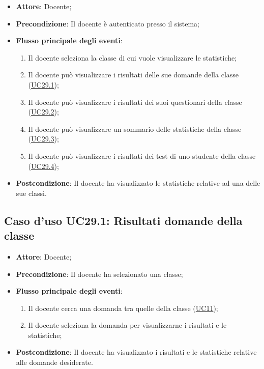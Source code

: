 \documentclass[12pt,a4paper]{article}
\begin{document}
\begin{itemize}

\item \textbf{Attore}: Docente; 
\item \textbf{Precondizione}: Il docente è autenticato presso il sistema;

\item \textbf{Flusso principale degli eventi}:
\begin{enumerate}
	\item Il docente seleziona la classe di cui vuole visualizzare le statistiche;
	\item Il docente può visualizzare i risultati delle sue domande della classe (\hyperlink{UC29.1}{UC29.1});
	\item Il docente può visualizzare i risultati dei suoi questionari della classe (\hyperlink{UC29.2}{UC29.2});
	\item Il docente può visualizzare un sommario delle statistiche della classe (\hyperlink{UC29.3}{UC29.3});
	\item Il docente può visualizzare i risultati dei test di uno studente della classe (\hyperlink{UC29.4}{UC29.4});
	
\end{enumerate}
\item \textbf{Postcondizione}: Il docente ha visualizzato le statistiche relative ad una delle sue classi.
\end{itemize}
\hypertarget{UC29.1}{}
\subsection{Caso d'uso UC29.1: Risultati domande della classe}

\begin{itemize}

\item \textbf{Attore}: Docente; 
\item \textbf{Precondizione}: Il docente ha selezionato una classe;

\item \textbf{Flusso principale degli eventi}:
\begin{enumerate}
	\item Il docente cerca una domanda tra quelle della classe (\hyperlink{UC11}{UC11});
	\item Il docente seleziona la domanda per visualizzarne i risultati e le statistiche;
	
\end{enumerate}
\item \textbf{Postcondizione}: Il docente ha visualizzato i risultati e le statistiche relative alle domande desiderate.
\end{itemize}
\hypertarget{UC29.2}{}
\end{document}
